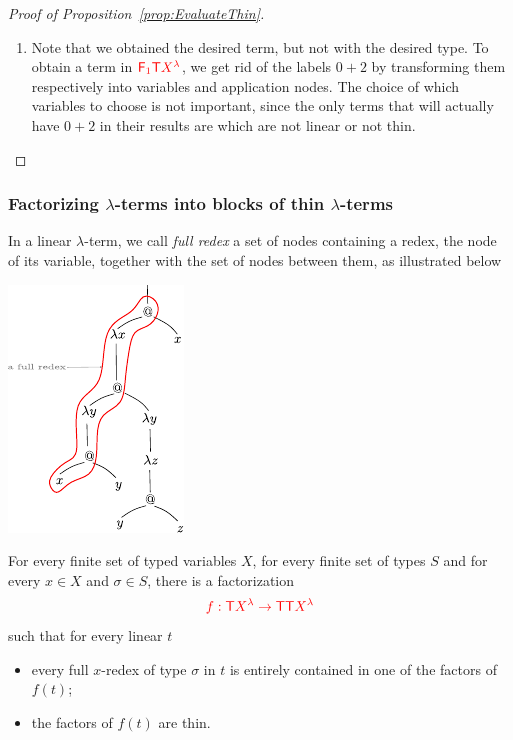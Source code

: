 \begin{proof}[Proof of Proposition~\ref{prop:EvaluateThin}]
\begin{enumerate}
\item Note that we obtained the desired term, but not with the desired type. To obtain a term in 
${\color{red}{{\color{red}{\mathsf F_{1}}}{\color{red}{\mathsf T}}{X^\lambda}}}$, we get rid of the labels $0+2$ by transforming them respectively into variables and application nodes. The choice of which variables to choose is not important, since the only terms that will actually have $0+2$ in their results are \lambdaterms which are not linear or not thin.
\end{enumerate}
\end{proof}

  



\subsubsection{Factorizing $\lambda$-terms into blocks of thin $\lambda$-terms}\label{subsub:facto}

In a linear $\lambda$-term, we call \emph{full redex} a set of nodes  containing a redex, the node of its variable, together with the set of nodes between them, as illustrated below
\begin{center}
\includegraphics[scale=1.5]{pictures/full-redex.pdf}
\end{center}


\begin{proposition}\label{prop:FactoIntoThin} For every finite set of typed variables $X$, for every finite set of types $S$ and for every $x\in X$ and $\sigma\in S$, there is a factorization $${\color{red}{f:{\color{red}{\mathsf T}}{\color{red}{X^\lambda}} \to {\color{red}{\mathsf T}}{\color{red}{\mathsf T}}{\color{red}{X^\lambda}}}}$$ 
such that for every linear \lambdaterm $t$
\begin{itemize}
\item every full $x$-redex of type $\sigma$ in $t$ is entirely contained in one of the factors of $f(t)$;
\item the factors of $f(t)$ are thin.
\end{itemize}
\end{proposition}

